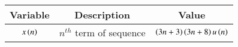 
\begin{tabular}{|c|c|c|} 
    \hline
\textbf{Variable}& \textbf{Description}& \textbf{Value}\\\hline
       $x\left(n\right)$& $n^{th}$ term of sequence& $\left(3n+3\right)\left(3n+8\right)u\left(n\right)$\\\hline
        
  \end{tabular}